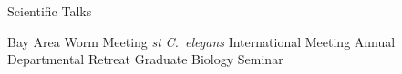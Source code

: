 \begin{rubric}{Scientific Talks}

\entry*[2018]
  Bay Area Worm Meeting
\emph{st} \emph{C.~elegans} International Meeting
\entry*[2017]
  Annual Departmental Retreat
\entry*[2016]
  Graduate Biology Seminar
\end{rubric}
